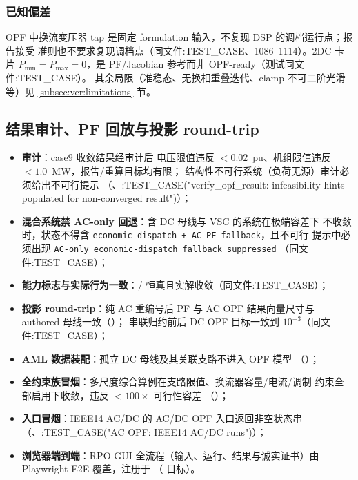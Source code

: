 \subsubsection*{已知偏差}
OPF 中换流变压器 tap 是固定 formulation 输入，不复现 DSP 的调档运行点；报告接受
准则也不要求复现调档点（同文件:TEST\_CASE、1086--1114）。2DC 卡片
$P_{\min}=P_{\max}=0$，是 PF/Jacobian 参考而非 OPF-ready（测试同文件:TEST\_CASE）。
其余局限（准稳态、无换相重叠迭代、clamp 不可二阶光滑等）见
\ref{subsec:ver:limitations} 节。

\subsection{结果审计、PF 回放与投影 round-trip}\label{subsec:ver:audit}

\begin{itemize}
  \item \textbf{ 审计}：case9 收敛结果经审计后
        电压限值违反 $<0.02$~pu、机组限值违反 $<1.0$~MW，报告/重算目标均有限；
        结构性不可行系统（负荷无源）审计必须给出不可行提示
        （、:TEST\_CASE("verify\_opf\_result: infeasibility hints populated for non-converged result")）；
  \item \textbf{混合系统禁 AC-only 回退}：含 DC 母线与 VSC 的系统在极端容差下
        不收敛时，状态不得含 \texttt{economic-dispatch + AC PF fallback}，且不可行
        提示中必须出现 \texttt{AC-only economic-dispatch fallback suppressed}
        （同文件:TEST\_CASE）；
  \item \textbf{能力标志与实际行为一致}：/
         恒真且实解收敛（同文件:TEST\_CASE）；
  \item \textbf{投影 round-trip}：纯 AC 重编号后 PF 与 AC OPF 结果向量尺寸与
        authored 母线一致（）；
        串联归约前后 DC OPF 目标一致到 $10^{-3}$（同文件:TEST\_CASE）；
  \item \textbf{AML 数据装配}：孤立 DC 母线及其关联支路不进入 OPF 模型
        （）；
  \item \textbf{全约束族冒烟}：多尺度综合算例在支路限值、换流器容量/电流/调制
        约束全部启用下收敛，违反 $<100\times$ 可行性容差
        （）；
  \item \textbf{入口冒烟}：IEEE14 AC/DC 的 AC/DC OPF 入口返回非空状态串
        （、:TEST\_CASE("AC OPF: IEEE14 AC/DC runs")）；
  \item \textbf{浏览器端到端}：RPO GUI 全流程（输入、运行、结果与诚实证书）由
        Playwright E2E 覆盖，注册于 （ 目标）。
\end{itemize}



